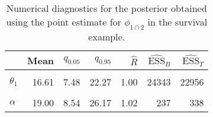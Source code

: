 \begin{table}

\caption{Numerical diagnostics for the posterior obtained using the point estimate for $\phi_{1 \cap 2}$ in the survival example.}
\centering
\begin{tabular}[t]{lrrrrrr}
\toprule
  & Mean & $q_{0.05}$ & $q_{0.95}$ & $\widehat{R}$ & $\widehat{\text{ESS}}_{B}$ & $\widehat{\text{ESS}}_{T}$\\
\midrule
\cellcolor{gray!6}{$\theta_{0}$} & \cellcolor{gray!6}{5.93} & \cellcolor{gray!6}{2.07} & \cellcolor{gray!6}{8.96} & \cellcolor{gray!6}{1.00} & \cellcolor{gray!6}{24233} & \cellcolor{gray!6}{24180}\\
$\theta_{1}$ & 16.61 & 7.48 & 22.27 & 1.00 & 24343 & 22956\\
\cellcolor{gray!6}{$\gamma$} & \cellcolor{gray!6}{10.12} & \cellcolor{gray!6}{7.60} & \cellcolor{gray!6}{12.00} & \cellcolor{gray!6}{1.01} & \cellcolor{gray!6}{399} & \cellcolor{gray!6}{1022}\\
$\alpha$ & 19.00 & 8.54 & 26.17 & 1.02 & 237 & 338\\
\bottomrule
\end{tabular}
\end{table}
